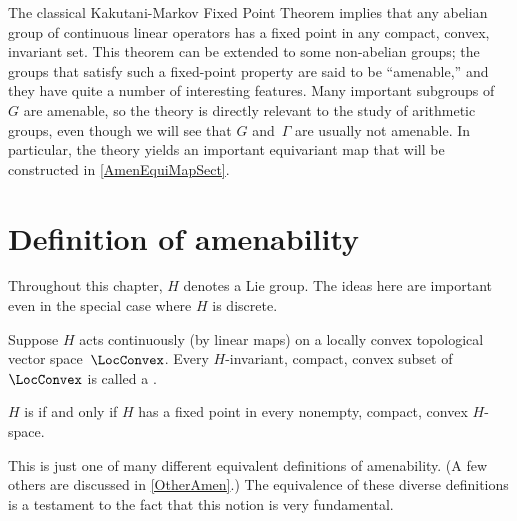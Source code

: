 
\label{AmenableChap}



The classical {Kakutani-Markov Fixed Point Theorem}  implies that any abelian group of continuous linear operators has a fixed point in any compact, convex, invariant set. This theorem can be extended to some non-abelian groups; the groups that satisfy such a fixed-point property are said to be ``amenable\zz,'' and they have quite a number of interesting features. 
Many important subgroups of~$G$ are amenable, so the theory is directly relevant to the study of arithmetic groups, even though we will see that $G$ and~$\Gamma$ are usually not amenable. In particular, the theory yields an important equivariant map that will be constructed in \cref{AmenEquiMapSect}.



\section{Definition of amenability}

\begin{assump}
Throughout this chapter, $H$ denotes a Lie group.
The ideas here are important even in the special case where $H$ is discrete.
\end{assump}

\begin{defn} \label{CpctCnvxDefn}
Suppose $H$ acts continuously (by linear maps) on a locally convex topological vector space~$\LocConvex$.
Every $H$-invariant, compact, convex subset of~$\LocConvex$ is called a .
\end{defn}

\begin{defn} \label{AmenDefn}
$H$ is  if and only if $H$ has a fixed point in every nonempty, compact, convex $H$-space.
\end{defn}

This is just one of many different equivalent definitions of amenability. (A few others are discussed in \cref{OtherAmen}.) The equivalence of these diverse definitions is a testament to the fact that this notion is very fundamental. 

